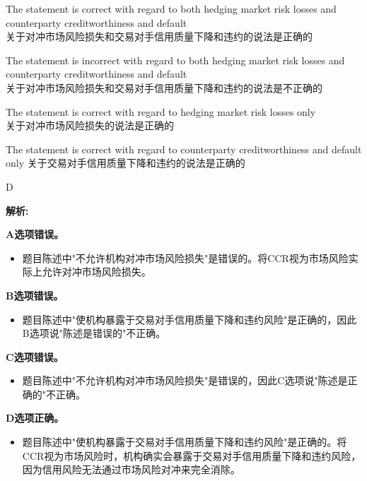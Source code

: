 \documentclass{article}
\newenvironment{explanation}
{\textbf{解析:}\par}
{\par}
\begin{document}
\begin{choices}
    \item The statement is correct with regard to both hedging market risk losses and counterparty creditworthiness and default\\
    关于对冲市场风险损失和交易对手信用质量下降和违约的说法是正确的
    \item The statement is incorrect with regard to both hedging market risk losses and counterparty creditworthiness and default\\
    关于对冲市场风险损失和交易对手信用质量下降和违约的说法是不正确的
    \item The statement is correct with regard to hedging market risk losses only\\
    关于对冲市场风险损失的说法是正确的
    \item The statement is correct with regard to counterparty creditworthiness and default only
    关于交易对手信用质量下降和违约的说法是正确的
\end{choices}

\begin{correctanswer}
    D
\end{correctanswer}

\begin{explanation}
    \textbf{A选项错误。}
    \begin{itemize}
        \item 题目陈述中"不允许机构对冲市场风险损失"是错误的。将CCR视为市场风险实际上允许对冲市场风险损失。
    \end{itemize}

    \textbf{B选项错误。}
    \begin{itemize}
        \item 题目陈述中"使机构暴露于交易对手信用质量下降和违约风险"是正确的，因此B选项说"陈述是错误的"不正确。
    \end{itemize}

    \textbf{C选项错误。}
    \begin{itemize}
        \item 题目陈述中"不允许机构对冲市场风险损失"是错误的，因此C选项说"陈述是正确的"不正确。
    \end{itemize}

    \textbf{D选项正确。}
    \begin{itemize}
        \item 题目陈述中"使机构暴露于交易对手信用质量下降和违约风险"是正确的。将CCR视为市场风险时，机构确实会暴露于交易对手信用质量下降和违约风险，因为信用风险无法通过市场风险对冲来完全消除。
    \end{itemize}
\end{explanation}
\end{document}
